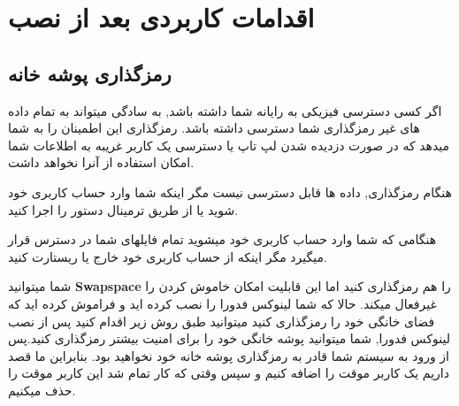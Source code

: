 \chapter{اقدامات کاربردی بعد از نصب}\label{ch-4}
\section{رمزگذاری پوشه خانه}\label{se-41}
اگر کسی دسترسی فیزیکی به رایانه شما داشته باشد, به سادگی میتواند به تمام داده های غیر رمزگذاری شما دسترسی داشته باشد.
رمزگذاری
این اطمینان را به شما میدهد که در صورت دزدیده شدن لپ تاپ یا دسترسی یک کاربر غریبه به اطلاعات شما امکان استفاده از آنرا نخواهد داشت.

هنگام رمزگذاری, داده ها قابل دسترسی نیست مگر اینکه شما وارد حساب کاربری خود شوید یا از طریق ترمینال دستور
		را اجرا کنید.
		\begin{tcolorbox}[title=رمزگذاری]
	هنگامی که شما وارد حساب کاربری خود میشوید تمام فایلهای شما در دسترس قرار میگیرد مگر اینکه از حساب کاربری خود خارج یا ریستارت کنید.
		\end{tcolorbox}
شما میتوانید 
	\textbf{Swapspace}
	را هم رمزگذاری کنید اما این قابلیت امکان خاموش کردن را غیرفعال میکند. حالا که شما لینوکس فدورا را نصب کرده اید و فراموش کرده اید که فضای خانگی خود را رمزگذاری کنید میتوانید طبق روش زیر اقدام کنید
پس از نصب لینوکس فدورا, شما میتوانید پوشه خانگی 
خود را برای امنیت بیشتر رمزگذاری کنید.پس از ورود به سیستم شما قادر به رمزگذاری پوشه خانه خود نخواهید بود. بنابراین ما قصد داریم یک کاربر موقت را اضافه کنیم و سپس وقتی که کار تمام شد این کاربر موقت را حذف میکنیم.
